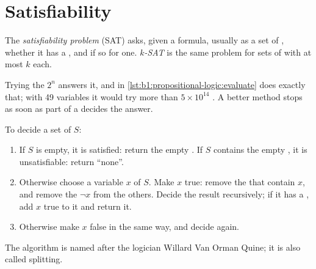 \section{Satisfiability}\label{sec:b1:propositional-logic:sat}

\begin{definition}\label{def:b1:propositional-logic:sat}
The \emph{satisfiability problem} (SAT) asks, given a formula, usually as a set of
, whether it has a , and if so for one. \emph{$k$-SAT} is the same problem for sets
of  with at most $k$  each.
\end{definition}

Trying the $2^n$  answers it, and  in \cref{lst:b1:propositional-logic:evaluate} does exactly
that; with 49 variables it would try more than $5 \times 10^{14}$ . A better method stops as soon as part of a
 decides the answer.

\begin{method}\label{met:b1:propositional-logic:quine}
To decide a set of  $S$:
\begin{enumerate}
\item If $S$ is empty, it is satisfied: return the empty . If $S$ contains the empty , it is
unsatisfiable: return ``none''.
\item Otherwise choose a variable $x$ of $S$. Make $x$ true: remove the  that contain $x$, and remove the
 $\neg x$ from the others. Decide the result recursively; if it has a , add $x$ true to it and return it.
\item Otherwise make $x$ false in the same way, and decide again.
\end{enumerate}
The algorithm is named after the logician Willard Van Orman Quine; it is also called splitting.
\end{method}

